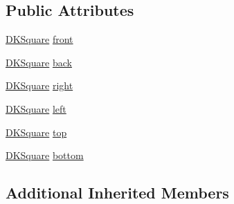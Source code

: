 \subsection*{Public Attributes}
\begin{DoxyCompactItemize}
\item 
\hyperlink{class_d_k_square}{D\-K\-Square} \hyperlink{class_d_k_cube_a6a7f3582d4ebf7ca50dabda3832126ab}{front}
\item 
\hyperlink{class_d_k_square}{D\-K\-Square} \hyperlink{class_d_k_cube_aec88e3706d5f04a03efe97d7cc924318}{back}
\item 
\hyperlink{class_d_k_square}{D\-K\-Square} \hyperlink{class_d_k_cube_a7d12e2340c7378dc22ee1b3ac440aed5}{right}
\item 
\hyperlink{class_d_k_square}{D\-K\-Square} \hyperlink{class_d_k_cube_abfd90cda0006120712a7a118afb8c328}{left}
\item 
\hyperlink{class_d_k_square}{D\-K\-Square} \hyperlink{class_d_k_cube_aa3a9b9315bf08c4dfff0e19d191d731d}{top}
\item 
\hyperlink{class_d_k_square}{D\-K\-Square} \hyperlink{class_d_k_cube_ae0f631844230348b3f41b0a774f1a90d}{bottom}
\end{DoxyCompactItemize}
\subsection*{Additional Inherited Members}


